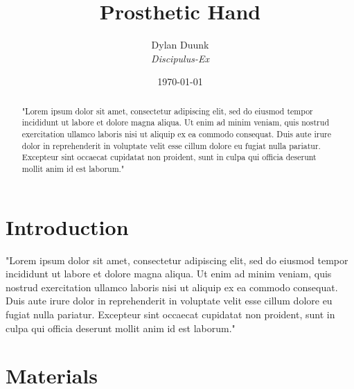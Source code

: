 \documentclass[a4paper]{article}
\title{\Huge{Prosthetic Hand} }
\author{Dylan Duunk \\ \textit{Discipulus-Ex} }
\date{\today}
\begin{document}
\begin{titlepage}
    \maketitle
\end{titlepage}

\listoftodos[TODO]

\newpage

\begin{abstract}
    \noindent 
    "Lorem ipsum dolor sit amet, consectetur adipiscing elit, sed do eiusmod tempor incididunt ut labore et dolore magna aliqua. 
    Ut enim ad minim veniam, quis nostrud exercitation ullamco laboris nisi ut aliquip ex ea commodo consequat. 
    Duis aute irure dolor in reprehenderit in voluptate velit esse cillum dolore eu fugiat nulla pariatur. 
    Excepteur sint occaecat cupidatat non proident, sunt in culpa qui officia deserunt mollit anim id est laborum."
\end{abstract}

\newpage
\tableofcontents
\newpage
{}

\section{Introduction}
"Lorem ipsum dolor sit amet, consectetur adipiscing elit, sed do eiusmod tempor incididunt ut labore et dolore magna aliqua. 
Ut enim ad minim veniam, quis nostrud exercitation ullamco laboris nisi ut aliquip ex ea commodo consequat. 
Duis aute irure dolor in reprehenderit in voluptate velit esse cillum dolore eu fugiat nulla pariatur. 
Excepteur sint occaecat cupidatat non proident, sunt in culpa qui officia deserunt mollit anim id est laborum."

\section{Materials}
\end{document}
